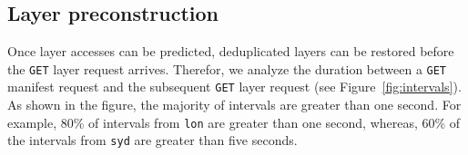 %
%
%
%



\subsection{Layer preconstruction}
\label{sec:layer-preconstruction}


%

Once layer accesses can be predicted, deduplicated layers can be restored
before the \texttt{GET} layer request arrives.
%
%
Therefor, we analyze the duration between a \texttt{GET} manifest request and the subsequent
\texttt{GET} layer request (see Figure~\ref{fig:intervals}).
%
As shown in the figure, the majority of intervals are greater than one second.
%
For example, 80\% of intervals from \texttt{lon} are greater than one second,
whereas, 60\% of the intervals from \texttt{syd} are greater than five seconds. 
%

